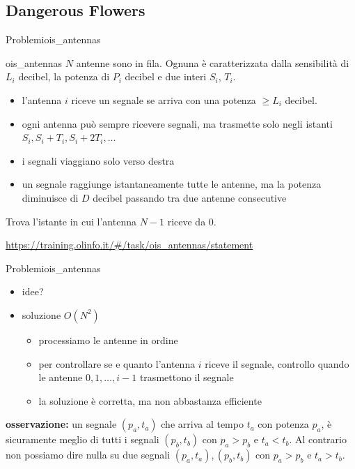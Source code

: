 \documentclass[compress]{beamer}
\begin{document}
\subsection{Dangerous Flowers}
\begin{frame}{Problemi}{ois\_antennas}
    \begin{exampleblock}{ois\_antennas}
        $N$ antenne sono in fila. Ognuna \`e caratterizzata dalla sensibilit\`a di $L_i$ decibel, la potenza di $P_i$ decibel e due interi $S_i$, $T_i$.
        \begin{itemize}
            \item l'antenna $i$ riceve un segnale se arriva con una potenza $\geq L_i$ decibel.
            \item ogni antenna pu\`o sempre ricevere segnali, ma trasmette solo negli istanti $S_i, S_i + T_i, S_i + 2T_i,  \dots$
            \item i segnali viaggiano solo verso destra
            \item un segnale raggiunge istantaneamente tutte le antenne, ma la potenza diminuisce di $D$ decibel passando tra due antenne consecutive
        \end{itemize}
        Trova l'istante in cui l'antenna $N-1$ riceve da $0$.
    \end{exampleblock}
    \underline{\url{https://training.olinfo.it/\#/task/ois_antennas/statement}}
\end{frame}

\begin{frame}{Problemi}{ois\_antennas}
    \begin{itemize}
        \item idee?
        \pause
        \item soluzione $O(N^2)$
        \begin{itemize}
            \item processiamo le antenne in ordine
            \item per controllare se e quanto l'antenna $i$ riceve il segnale, controllo quando le antenne $0, 1, \dots, i-1$ trasmettono il segnale
            \item la soluzione \`e corretta, ma non abbastanza efficiente
        \end{itemize}
    \end{itemize}
    \pause
    \textbf{osservazione:} un segnale $(p_a, t_a)$ che arriva al tempo $t_a$ con potenza $p_a$, \`e sicuramente meglio di tutti i segnali $(p_b, t_b)$ con $p_a > p_b$ e $t_a < t_b$.
    \pause
    Al contrario non possiamo dire nulla su due segnali $(p_a, t_a), (p_b, t_b)$ con $p_a > p_b$ e $t_a > t_b$.
\end{frame}
\end{document}
